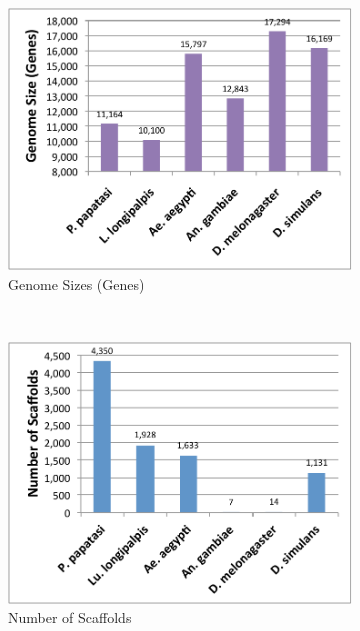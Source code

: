 \begin{figure}[H]
  \centering
  \begin{subfigure}[b]{0.45\textwidth}
    \includegraphics[width=\textwidth]{figures/synteny/genome_size_genes.pdf}
    \caption{Genome Sizes (Genes)}
  \end{subfigure}
  ~
  \begin{subfigure}[b]{0.45\textwidth}
    \includegraphics[width=\textwidth]{figures/synteny/scaffold_counts.pdf}
    \caption{Number of Scaffolds}
  \end{subfigure}
  ~
  \begin{subfigure}[b]{0.45\textwidth}

\end{subfigure}
\end{figure}
